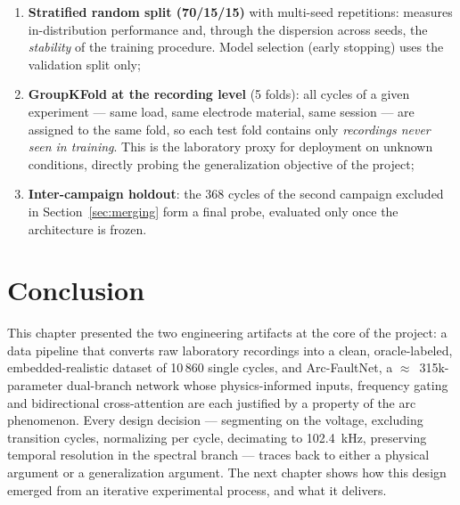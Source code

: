 \begin{enumerate}[itemsep=2pt]
    \item \textbf{Stratified random split (70/15/15)} with multi-seed repetitions: measures in-distribution performance and, through the dispersion across seeds, the \emph{stability} of the training procedure. Model selection (early stopping) uses the validation split only;
    \item \textbf{GroupKFold at the recording level} (5 folds): all cycles of a given experiment --- same load, same electrode material, same session --- are assigned to the same fold, so each test fold contains only \emph{recordings never seen in training}. This is the laboratory proxy for deployment on unknown conditions, directly probing the generalization objective of the project;
    \item \textbf{Inter-campaign holdout}: the 368 cycles of the second campaign excluded in Section~\ref{sec:merging} form a final probe, evaluated only once the architecture is frozen.
\end{enumerate}

\section*{Conclusion}

This chapter presented the two engineering artifacts at the core of the project: a data pipeline that converts raw laboratory recordings into a clean, oracle-labeled, embedded-realistic dataset of 10\,860 single cycles, and Arc-FaultNet, a $\approx$~315k-parameter dual-branch network whose physics-informed inputs, frequency gating and bidirectional cross-attention are each justified by a property of the arc phenomenon. Every design decision --- segmenting on the voltage, excluding transition cycles, normalizing per cycle, decimating to 102.4~kHz, preserving temporal resolution in the spectral branch --- traces back to either a physical argument or a generalization argument. The next chapter shows how this design emerged from an iterative experimental process, and what it delivers.

